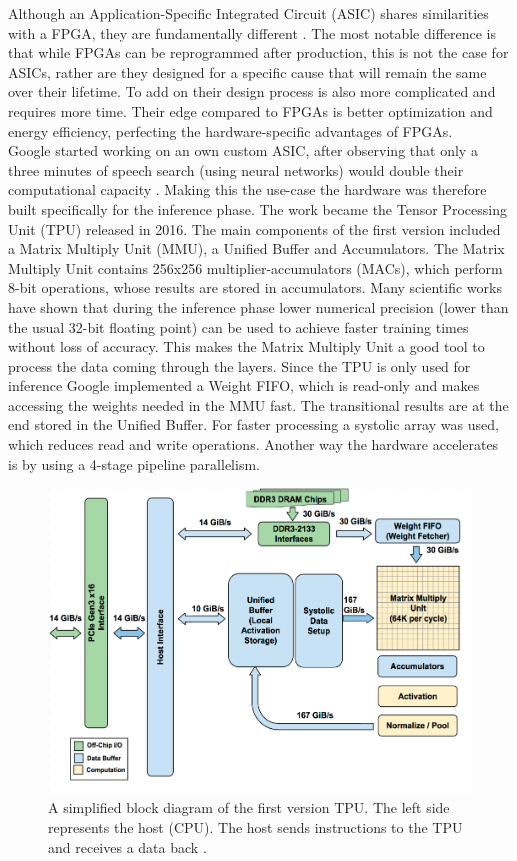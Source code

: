 \documentclass[conference]{IEEEtran}
\begin{document}
	Although an Application-Specific Integrated Circuit (ASIC) shares similarities with a FPGA, they are fundamentally different \cite{capra2020updated}. The most notable difference is that while FPGAs can be reprogrammed after production, this is not the case for ASICs, rather are they designed for a specific cause that will remain the same over their lifetime. To add on their design process is also more complicated and requires more time. Their edge compared to FPGAs is better optimization and energy efficiency, perfecting the hardware-specific advantages of FPGAs.
	\\
	Google started working on an own custom ASIC, after observing that only a three minutes of speech search (using neural networks) would double their computational capacity \cite{jouppi2017datacenter}. Making this the use-case the hardware was therefore built specifically for the inference phase. The work became the Tensor Processing Unit (TPU) released in 2016. The main components of the first version included a Matrix Multiply Unit (MMU), a Unified Buffer and Accumulators. The Matrix Multiply Unit contains 256x256 multiplier-accumulators (MACs), which perform 8-bit operations, whose results are stored in accumulators. Many scientific works have shown that during the inference phase lower numerical precision (lower than the usual 32-bit floating point) can be used to achieve faster training times without loss of accuracy\cite{rodriguez2018lower}. This makes the Matrix Multiply Unit a good tool to process the data coming through the layers. Since the TPU is only used for inference Google implemented a Weight FIFO, which is read-only and makes accessing the weights needed in the MMU fast. The transitional results are at the end stored in the Unified Buffer. For faster processing a systolic array was used, which reduces read and write operations. 
	Another way the hardware accelerates is by using a 4-stage pipeline parallelism.
	\begin{figure}[h]
		\caption{A simplified block diagram of the first version TPU. The left side represents the host (CPU). The host sends instructions to the TPU and receives a data back \cite{jouppi2017datacenter}.}
		\centering
		\includegraphics[width=\linewidth]{pictures/tpu_floorplan.png}
	\end{figure}
\end{document}
